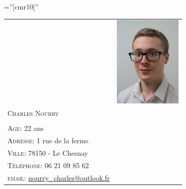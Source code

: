 \documentclass[a4paper,10pt]{article}
\begin{document}
\pagestyle{empty} %

\font\fb=''[cmr10]'' %




  \begin{tabular}{ p{11.5cm}r }
   & \multirow{2}{*}{\includegraphics[width=1.3in]{pic}}\\
   \\
   \scshape{\Huge{Charles Nourry}} & \\
   \\
   \textsc{Age:} 22 ans &\\
    \textsc{Adresse:} 1 rue de la ferme &\\
    \textsc{Ville:} 78150 - Le Chesnay&\\
    \textsc{Téléphone:} 06 21 09 85 62&\\
    \textsc{email:} \href{mailto:nourry\_charles@outlook.fr}{nourry\_charles@outlook.fr}& %
  \end{tabular}
  
  \vspace{0.3in}


\end{document}

